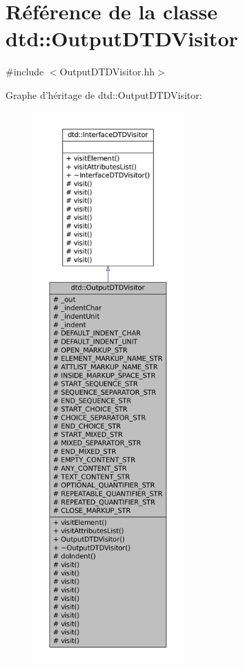 \hypertarget{classdtd_1_1_output_d_t_d_visitor}{
\section{Référence de la classe dtd::OutputDTDVisitor}
\label{classdtd_1_1_output_d_t_d_visitor}
}


{\ttfamily \#include $<$OutputDTDVisitor.hh$>$}



Graphe d'héritage de dtd::OutputDTDVisitor:\nopagebreak
\begin{figure}[H]
\begin{center}
\leavevmode
\includegraphics[height=600pt]{classdtd_1_1_output_d_t_d_visitor__inherit__graph}
\end{center}
\end{figure}


